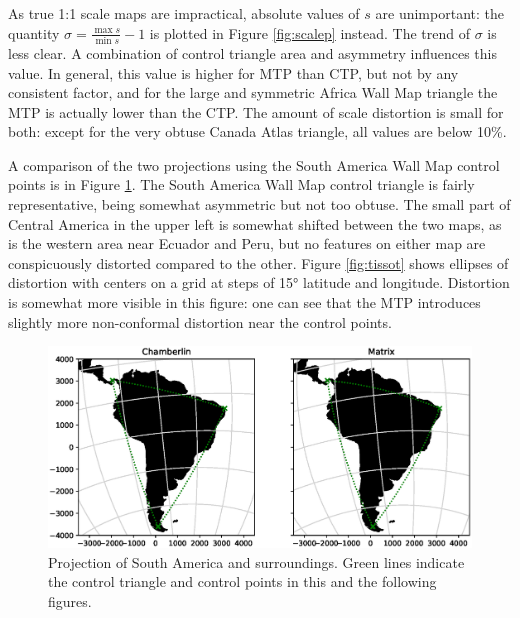 \documentclass[]{interact}
\begin{document}
As true 1:1 scale maps are impractical, absolute values of $s$ are unimportant:
the quantity $\sigma = \frac{\max s}{\min s} - 1$ is plotted in Figure
\ref{fig:scalep} instead. The trend of $\sigma$ is less clear. A combination of
control triangle area and asymmetry influences this value. In general, this
value is higher for MTP than CTP, but not by any consistent factor,
and for the large and symmetric Africa Wall Map triangle the MTP is
actually lower than the CTP. The amount of scale distortion is small for both:
except for the very obtuse Canada Atlas triangle, all values are below 10\%.

A comparison of the two projections using the South America Wall Map control
points is in Figure \ref{fig:proj}.
The South America Wall Map control triangle is fairly
representative, being somewhat asymmetric but not too obtuse. The small part of
Central America in the upper left is somewhat shifted between the two maps, as
is the western area near Ecuador and Peru, but no features on either map are
conspicuously distorted compared to the other. Figure \ref{fig:tissot} shows
ellipses of distortion with centers on a grid at steps of 15° latitude and
longitude.
Distortion is somewhat more visible in this figure: one can see that the
MTP introduces slightly more non-conformal distortion near the control points.

\begin{figure}
  \includegraphics[width=\textwidth]{South_America_Wall_Map_zoom}
  \caption{Projection of South America and surroundings. Green lines indicate
  the control triangle and control points in this and the following figures.}
  \label{fig:proj}
\end{figure}
\end{document}
